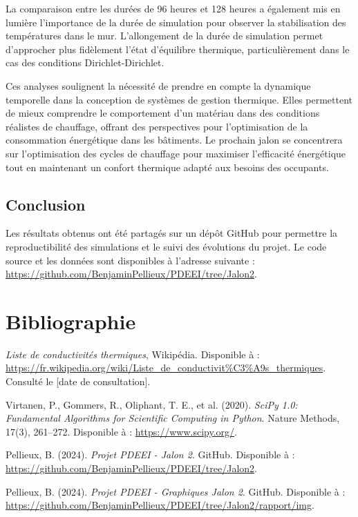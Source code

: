 \documentclass[a4paper,11pt]{article}
\begin{document}
La comparaison entre les durées de 96 heures et 128 heures a également mis en lumière l'importance de la durée de simulation pour observer la stabilisation des températures dans le mur. L'allongement de la durée de simulation permet d'approcher plus fidèlement l'état d'équilibre thermique, particulièrement dans le cas des conditions Dirichlet-Dirichlet.

Ces analyses soulignent la nécessité de prendre en compte la dynamique temporelle dans la conception de systèmes de gestion thermique. Elles permettent de mieux comprendre le comportement d'un matériau dans des conditions réalistes de chauffage, offrant des perspectives pour l'optimisation de la consommation énergétique dans les bâtiments. Le prochain jalon se concentrera sur l'optimisation des cycles de chauffage pour maximiser l'efficacité énergétique tout en maintenant un confort thermique adapté aux besoins des occupants.

\subsection{Conclusion}
Les résultats obtenus ont été partagés sur un dépôt GitHub pour permettre la reproductibilité des simulations et le suivi des évolutions du projet. Le code source et les données sont disponibles à l'adresse suivante : \url{https://github.com/BenjaminPellieux/PDEEI/tree/Jalon2}.


\newpage
\section*{Bibliographie}
\begin{thebibliography}{9}
    \textit{Liste de conductivités thermiques}, Wikipédia. Disponible à : \url{https://fr.wikipedia.org/wiki/Liste_de_conductivit%C3%A9s_thermiques}. Consulté le [date de consultation].
    
    Virtanen, P., Gommers, R., Oliphant, T. E., et al. (2020). \textit{SciPy 1.0: Fundamental Algorithms for Scientific Computing in Python}. Nature Methods, 17(3), 261–272. Disponible à : \url{https://www.scipy.org/}.
    
    Pellieux, B. (2024). \textit{Projet PDEEI - Jalon 2}. GitHub. Disponible à : \url{https://github.com/BenjaminPellieux/PDEEI/tree/Jalon2}.

    Pellieux, B. (2024). \textit{Projet PDEEI - Graphiques Jalon 2}. GitHub. Disponible à : \url{https://github.com/BenjaminPellieux/PDEEI/tree/Jalon2/rapport/img}.
\end{thebibliography}
\end{document}
